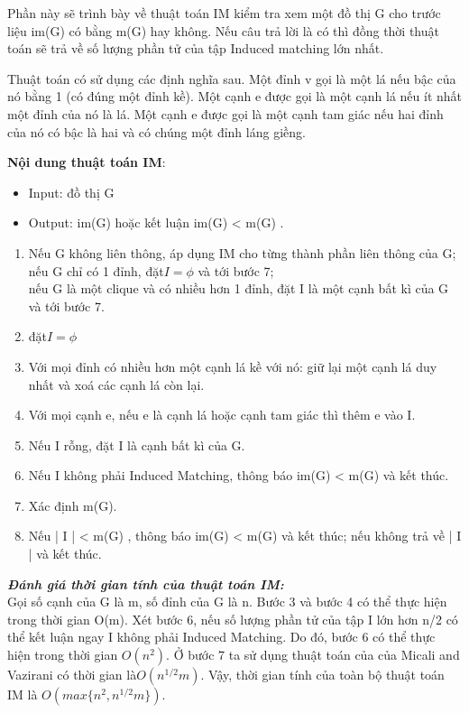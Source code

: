 \documentclass[14pt,a4paper]{extreport}
\begin{document}
Phần này sẽ trình bày về thuật toán IM kiểm tra xem một đồ thị G cho trước liệu im(G) có bằng m(G) hay không. Nếu câu trả lời là có thì đồng thời thuật toán sẽ trả về số lượng phần tử của tập Induced matching lớn nhất.

Thuật toán có sử dụng các định nghĩa sau. Một đỉnh v gọi là một lá nếu bậc của nó bằng 1 (có đúng một đỉnh kề). Một cạnh e được gọi là một cạnh lá nếu ít nhất một đỉnh của nó là lá. Một cạnh e được gọi là một cạnh tam giác nếu hai đỉnh của nó có bậc là hai và có chúng một đỉnh láng giềng.

\textbf{Nội dung thuật toán IM}:\\
\begin{itemize}
	\item Input: đồ thị G
	\item Output: im(G) hoặc kết luận im(G) < m(G) .
\end{itemize}

\begin{enumerate}
	\item Nếu G không liên thông, áp dụng IM cho từng thành phần liên thông của G;\\
	nếu G chỉ có 1 đỉnh, đặt$  I = \phi $ và tới bước 7;\\
	nếu G là một clique và có nhiều hơn 1 đỉnh, đặt I là một cạnh bất kì của G và tới bước 7.
	\item đặt$  I = \phi $
	\item Với mọi đỉnh có nhiều hơn một cạnh lá kề với nó: giữ lại một cạnh lá duy nhất và xoá các cạnh lá còn lại.
	\item Với mọi cạnh e, nếu e là cạnh lá hoặc cạnh tam giác thì thêm e vào I.
	\item Nếu I rỗng, đặt I là cạnh bất kì của G.
	\item 	Nếu I không phải Induced Matching, thông báo im(G) < m(G) và kết thúc.
	\item 	Xác định m(G).
	\item 	Nếu | I | < m(G) , thông báo im(G) < m(G) và kết thúc; nếu không trả về | I | và kết thúc.
\end{enumerate}

\textit{\textbf{Đánh giá thời gian tính của thuật toán IM:}}\\
Gọi số cạnh của G là m, số đỉnh của G là n. Bước 3 và bước 4 có thể thực hiện trong thời gian O(m). Xét bước 6, nếu số lượng phần tử của tập I lớn hơn n/2 có thể kết luận ngay I không phải Induced Matching. Do đó, bước 6 có thể thực hiện trong thời gian $ O(n^{2}) $. Ở bước 7 ta sử dụng thuật toán của của Micali and Vazirani có thời gian là$  O(n^{1/2}m) $. Vậy, thời gian tính của toàn bộ thuật toán IM là $ O(max\{n^{2}, n^{1/2}m\}) $.
\end{document}
